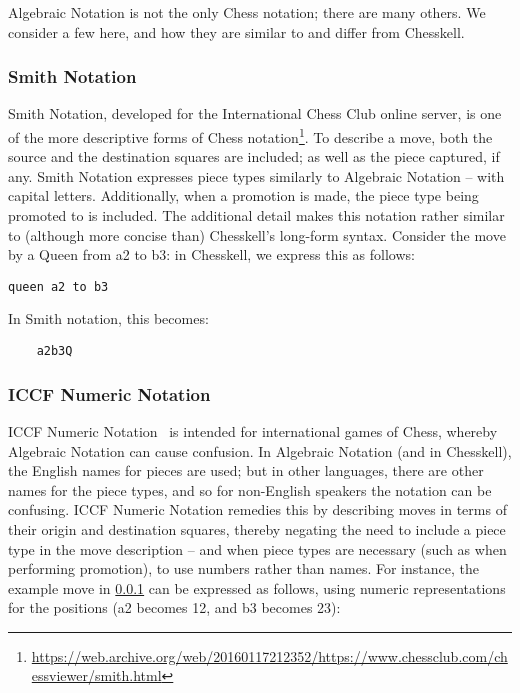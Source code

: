 Algebraic Notation is not the only Chess notation; there are many others. We consider a few here, and how they are similar to and differ from Chesskell.

\subsubsection{Smith Notation} \label{smithsection}

Smith Notation, developed for the International Chess Club online server, is one of the more descriptive forms of Chess notation\footnote{\url{https://web.archive.org/web/20160117212352/https://www.chessclub.com/chessviewer/smith.html}}. To describe a move, both the source and the destination squares are included; as well as the piece captured, if any. Smith Notation expresses piece types similarly to Algebraic Notation -- with capital letters. Additionally, when a promotion is made, the piece type being promoted to is included. The additional detail makes this notation rather similar to (although more concise than) Chesskell's long-form syntax. Consider the move by a Queen from a2 to b3: in Chesskell, we express this as follows:

\begin{lstlisting}
queen a2 to b3
\end{lstlisting}

In Smith notation, this becomes:

\begin{verbatim}
    a2b3Q
\end{verbatim}

\subsubsection{ICCF Numeric Notation} \label{numberextension}

ICCF Numeric Notation~\cite{iccfnotation} is intended for international games of Chess, whereby Algebraic Notation can cause confusion. In Algebraic Notation (and in Chesskell), the English names for pieces are used; but in other languages, there are other names for the piece types, and so for non-English speakers the notation can be confusing. ICCF Numeric Notation remedies this by describing moves in terms of their origin and destination squares, thereby negating the need to include a piece type in the move description -- and when piece types are necessary (such as when performing promotion), to use numbers rather than names. For instance, the example move in \cref{smithsection} can be expressed as follows, using numeric representations for the positions (a2 becomes 12, and b3 becomes 23):

